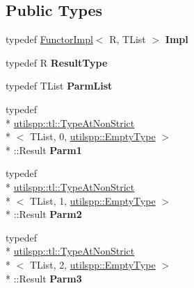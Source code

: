 \subsection*{Public Types}
\begin{DoxyCompactItemize}
\item 
\hypertarget{classutilspp_1_1Functor_a99a2e43a2eeed54dd40beb515914a9a2}{typedef \hyperlink{structutilspp_1_1FunctorImpl}{Functor\-Impl}$<$ R, T\-List $>$ {\bfseries Impl}}\label{classutilspp_1_1Functor_a99a2e43a2eeed54dd40beb515914a9a2}

\item 
\hypertarget{classutilspp_1_1Functor_a5542a47c91adb5810d22d34d29bee730}{typedef R {\bfseries Result\-Type}}\label{classutilspp_1_1Functor_a5542a47c91adb5810d22d34d29bee730}

\item 
\hypertarget{classutilspp_1_1Functor_a881db21cf78bfafa5690736ff332e431}{typedef T\-List {\bfseries Parm\-List}}\label{classutilspp_1_1Functor_a881db21cf78bfafa5690736ff332e431}

\item 
\hypertarget{classutilspp_1_1Functor_a588ae828cc0497982c437da15d3f22a9}{typedef \\*
\hyperlink{structutilspp_1_1tl_1_1TypeAtNonStrict}{utilspp\-::tl\-::\-Type\-At\-Non\-Strict}\\*
$<$ T\-List, 0, \hyperlink{structutilspp_1_1EmptyType}{utilspp\-::\-Empty\-Type} $>$\\*
\-::Result {\bfseries Parm1}}\label{classutilspp_1_1Functor_a588ae828cc0497982c437da15d3f22a9}

\item 
\hypertarget{classutilspp_1_1Functor_a5c7eb4c2a8c04533701440011387e879}{typedef \\*
\hyperlink{structutilspp_1_1tl_1_1TypeAtNonStrict}{utilspp\-::tl\-::\-Type\-At\-Non\-Strict}\\*
$<$ T\-List, 1, \hyperlink{structutilspp_1_1EmptyType}{utilspp\-::\-Empty\-Type} $>$\\*
\-::Result {\bfseries Parm2}}\label{classutilspp_1_1Functor_a5c7eb4c2a8c04533701440011387e879}

\item 
\hypertarget{classutilspp_1_1Functor_ab963c72c0eb58654b2b6b6502ffc6440}{typedef \\*
\hyperlink{structutilspp_1_1tl_1_1TypeAtNonStrict}{utilspp\-::tl\-::\-Type\-At\-Non\-Strict}\\*
$<$ T\-List, 2, \hyperlink{structutilspp_1_1EmptyType}{utilspp\-::\-Empty\-Type} $>$\\*
\-::Result {\bfseries Parm3}}\label{classutilspp_1_1Functor_ab963c72c0eb58654b2b6b6502ffc6440}


\end{DoxyCompactItemize}
